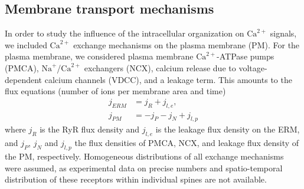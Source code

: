 \documentclass[12pt]{article}
\begin{document}
\subsection*{Membrane transport mechanisms} In order to study the influence of the intracellular organization on $\textrm{Ca}^{2+}$ signals, we included $\textrm{Ca}^{2+}$ exchange mechanisms on the plasma membrane (PM). For the plasma membrane, we considered plasma membrane $\textrm{Ca}^{2+}$-ATPase pumps (PMCA), $\textrm{Na}^{+}$/$\textrm{Ca}^{2+}$ exchangers (NCX), calcium release due to voltage-dependent calcium channels (VDCC), and a leakage term. This amounts to the flux equations (number of ions per membrane area and time)
\begin{align}
    j_{ERM}&=j_R+j_{l,e},\\
    j_{PM}&=-j_P-j_N + j_{l,p}
\end{align}
where $j_R$ is the RyR flux density and $j_{l,e}$ is the leakage flux density on the ERM, and $j_P$, $j_N$ and $j_{l,p}$ the flux densities of PMCA, NCX, and leakage flux density of the PM, respectively. Homogeneous distributions of all exchange mechanisms were assumed, as experimental data on precise numbers and spatio-temporal distribution of these receptors within individual spines are not available.
\end{document}
